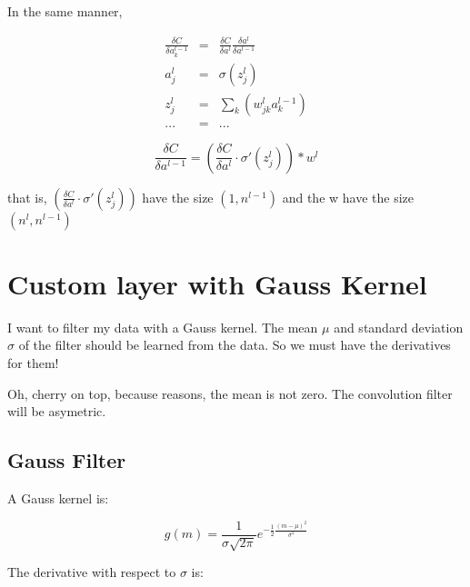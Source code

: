 \documentclass{article}
\begin{document}
In the same manner,

\begin{eqnarray}
	\frac{\delta C}{\delta a^{l-1}_k}&=&\frac{\delta C}{\delta a^l} \frac{\delta a^l}{\delta a^{l-1}}\\
	a^l_j&=&\sigma (z^l_j)\\
	z_j^l&=&\sum_{k}\left( w_{jk}^l a^{l-1}_k  \right)\\
	... &=& ...
\end{eqnarray}

\begin{equation}
	\frac{\delta C}{\delta a^{l-1}} = \left(\frac{\delta C}{\delta a^l} \cdot \sigma ' (z^l_j) \right) *w^{l}
\end{equation}

that is, $\left(\frac{\delta C}{\delta a^l} \cdot \sigma ' (z^l_j) \right)$ have the size $(1, n^{l-1})$ and
the w have the size $(n^l, n^{l-1})$ \\


\section{Custom layer with Gauss Kernel}

I want to filter my data with a Gauss kernel. The mean $\mu$ and standard deviation $\sigma$ of the filter should be learned from the data. So we must have the derivatives for them!

Oh, cherry on top, because reasons, the mean is not zero. The convolution filter will be asymetric.

\subsection{Gauss Filter}

A Gauss kernel is:

\begin{equation}
	g(m) = \frac{1}{\sigma \sqrt{2 \pi}}e^{-\frac{1}{2} \frac{(m - \mu)^2}{\sigma^2}}
\end{equation}


The derivative with respect to $\sigma$ is:
\end{document}
